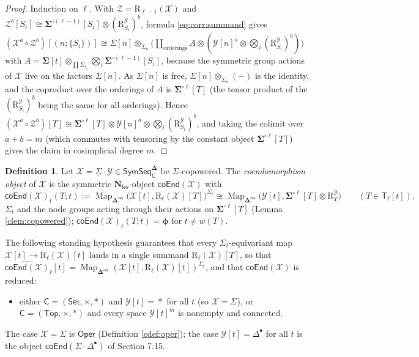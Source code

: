 \documentclass[12pt]{article}
\theoremstyle{plain}
\theoremstyle{definition}
\newtheorem{cdefinition}[ctheorem]{Definition}
\theoremstyle{remark}
\newcommand{\Cal}[1]{\mathcal{#1}}
\newcommand{\Nl}{\mathbf{N}_{\mathsf{lev}}}
\newcommand{\Oper}{\mathsf{Oper}}
\newcommand{\coend}[1]{\mathsf{coEnd}(#1)}
\newcommand{\SymSeq}{\mathsf{SymSeq}}
\newcommand{\bdel}{\mathbf{\Delta}}
\newcommand{\Dres}{\bdel^{\mathsf{res}}}
\newcommand{\SD}{\Sigma{\cdot}\Delta^{\bullet}}
\newcommand{\pt}{*}
\newcommand{\Map}{\operatorname{Map}}
\newcommand{\ptC}{\boldsymbol{\phi}}
\newcommand{\Tr}{\mathsf{T}}
\newcommand{\wt}{w}
\newcommand{\Rr}{\mathrm{R}}
\begin{document}
\begin{proof}
Induction on $\ell$. With $\Cal Z=\Rr_{\ell-1}(\Cal X)$ and $\Cal Z^b[S_i]\cong\mathbf\Sigma^{\circ(\ell-1)}[S_i]\otimes(\Rr^{\Cal Y}_{S_i})^b$, formula \eqref{eq:corr:summand} gives $(\Cal X^a\circ\Cal Z^b)[(n;\{S_i\})]\cong\Sigma[n]\otimes_{\Sigma_n}\big(\coprod_{\text{orderings}}A\otimes(\Cal Y[n]^a\otimes\bigotimes_i(\Rr^{\Cal Y}_{S_i})^b)\big)$ with $A=\mathbf\Sigma[t]\otimes_{\prod\Sigma_{s_i}}\bigotimes_i\mathbf\Sigma^{\circ(\ell-1)}[S_i]$, because the symmetric group actions of $\Cal X$ live on the factors $\Sigma[n]$. As $\Sigma[n]$ is free, $\Sigma[n]\otimes_{\Sigma_n}(-)$ is the identity, and the coproduct over the orderings of $A$ is $\mathbf\Sigma^{\circ\ell}[T]$ (the tensor product of the $(\Rr^{\Cal Y}_{S_i})^b$ being the same for all orderings). Hence $(\Cal X^a\circ\Cal Z^b)[T]\cong\mathbf\Sigma^{\circ\ell}[T]\otimes\Cal Y[n]^a\otimes\bigotimes_i(\Rr^{\Cal Y}_{S_i})^b$, and taking the colimit over $a+b=m$ (which commutes with tensoring by the constant object $\mathbf\Sigma^{\circ\ell}[T]$) gives the claim in cosimplicial degree $m$.
\end{proof}

\begin{cdefinition}\label{cdef:coend}
Let $\Cal X=\Sigma\cdot\Cal Y\in\SymSeq^{\bdel}_{\mathsf C}$ be $\Sigma$-copowered. The \emph{coendomorphism object} of $\Cal X$ is the symmetric $\Nl$-object $\coend{\Cal X}$ with
\[\coend{\Cal X}_\ell(T;t):=\Map_{\Dres}\big(\Cal X[t],\Rr_\ell(\Cal X)[T]\big)^{\Sigma_t}\cong\Map_{\Dres}\big(\Cal Y[t],\mathbf\Sigma^{\circ\ell}[T]\otimes\Rr^{\Cal Y}_T\big)\qquad(T\in\Tr_\ell[t]),\]
$\Sigma_t$ and the node groups acting through their actions on $\mathbf\Sigma^{\circ\ell}[T]$ (Lemma \ref{clem:copowered}); $\coend{\Cal X}_\ell(T;t)=\ptC$ for $t\neq\wt(T)$.
\end{cdefinition}

The following standing hypothesis guarantees that every $\Sigma_t$-equivariant map $\Cal X[t]\to\Rr_\ell(\Cal X)[t]$ lands in a single summand $\Rr_\ell(\Cal X)[T]$, so that $\widehat{\coend{\Cal X}}_\ell[t]=\Map_{\Dres}(\Cal X[t],\Rr_\ell(\Cal X)[t])^{\Sigma_t}$, and that $\coend{\Cal X}$ is reduced:
\begin{itemize}[leftmargin=2em]
\item[(H)] either $\mathsf C=(\mathsf{Set},\times,\pt)$ and $\Cal Y[t]=\underline\pt$ for all $t$ (so $\Cal X=\Sigma$), or $\mathsf C=(\mathsf{Top},\times,\pt)$ and every space $\Cal Y[t]^m$ is nonempty and connected.
\end{itemize}
The case $\Cal X=\Sigma$ is $\Oper$ (Definition \ref{cdef:oper}); the case $\Cal Y[t]=\Delta^\bullet$ for all $t$ is the object $\coend{\SD}$ of Section 7.15.
\end{document}
